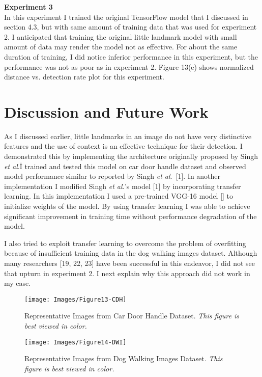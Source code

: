 \documentclass [11pt,letterpaper ,twoside ,openany ]{report}
\begin{document}
    \noindent
    \textbf{Experiment 3}\\             
    In this experiment I trained the original TensorFlow model that I discussed in section 4.3, but with same amount of training data that was used for experiment 2. I anticipated that training the original little landmark model with small amount of data may render the model not as effective. For about the same duration of training, I did notice inferior performance in this experiment, but the performance was not as poor as in experiment 2. Figure 13(e) shows normalized distance vs. detection rate plot for this experiment. 

    \chapter{Discussion and Future Work}
    \doublespacing
    As I discussed earlier, little landmarks in an image do not have very distinctive features and the use of context is an effective technique for their detection. I demonstrated this by implementing the architecture originally proposed by Singh \textit{et al}.\. I trained and tested this model on car door handle dataset and observed model performance similar to reported by Singh \textit{et al}.\ [1]. In another implementation I modified Singh \textit{et al.}'s model [1] by incorporating transfer learning. In this implementation I used a pre-trained VGG-16 model [] to initialize weights of the model. By using transfer learning I was able to achieve significant improvement in training time without performance degradation of the model. 

    I also tried to exploit transfer learning to overcome the problem of overfitting because of insufficient training data in the dog walking images dataset. Although many researchers [19, 22, 23] have been successful in this endeavor, I did not see that upturn in experiment 2. I next explain why this approach did not work in my case.\\

    \begin{figure}[h]
      \centering
      \texttt{[image: Images/Figure13-CDH]}
      \caption{Representative Images from Car Door Handle Dataset. \textit{This figure is best viewed in color.}}
      \label{fig:cdh}
    \end{figure}        

    \begin{figure}[h]
      \centering
      \texttt{[image: Images/Figure14-DWI]}
      \caption{Representative Images from Dog Walking Images Dataset. \textit{This figure is best viewed in color.}}
      \label{fig:dwi}
    \end{figure}            
\end{document}
